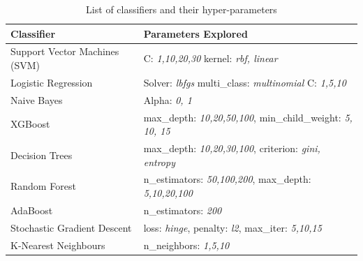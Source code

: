 \documentclass[12pt]{article}
\begin{document}
\begin{table}[tbp]
\centering
\begin{tabularx}{\linewidth}{ l X}
\toprule
   Classifier & Parameters Explored \\
\midrule
Support Vector Machines (SVM) & C: \textit{1,10,20,30} \newline kernel: \textit{rbf, linear} \newline \\
Logistic Regression & Solver: \textit{lbfgs} \newline multi\_class: \textit{multinomial} \newline C: \textit{1,5,10} \newline \\
Naive Bayes & Alpha: \textit{0, 1}\newline  \\
XGBoost & max\_depth: \textit{10,20,50,100}, \newline min\_child\_weight: \textit{5, 10, 15}\newline  \\
Decision Trees & max\_depth: \textit{10,20,30,100}, \newline criterion: \textit{gini, entropy} \newline \\
Random Forest & n\_estimators: \textit{50,100,200}, \newline max\_depth: \textit{5,10,20,100} \newline \\
AdaBoost & n\_estimators: \textit{200} \newline \\
Stochastic Gradient Descent & loss: \textit{hinge}, \newline penalty: \textit{l2}, \newline max\_iter: \textit{5,10,15} \newline \\
K-Nearest Neighbours & n\_neighbors: \textit{1,5,10} \newline \\

\bottomrule
\end{tabularx}
\caption{List of classifiers and their hyper-parameters}
\label{tbl:classifiers}
\end{table}
\end{document}
